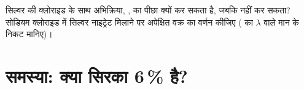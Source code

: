 \begin{exercise}[$\star\star\star$]\label{exo:g12:ph-conductivity-titrations:15}
 सिल्वर  की क्लोराइड  के साथ अभिक्रिया,
, का पीछा क्यों कर सकता है, जबकि  नहीं कर सकता? सोडियम क्लोराइड में सिल्वर नाइट्रेट मिलाने पर अपेक्षित
वक्र का वर्णन कीजिए ( का $\lambda$  वाले मान के
निकट मानिए)।
\end{exercise}

\section{समस्या: क्या सिरका 6\,\% है?}

